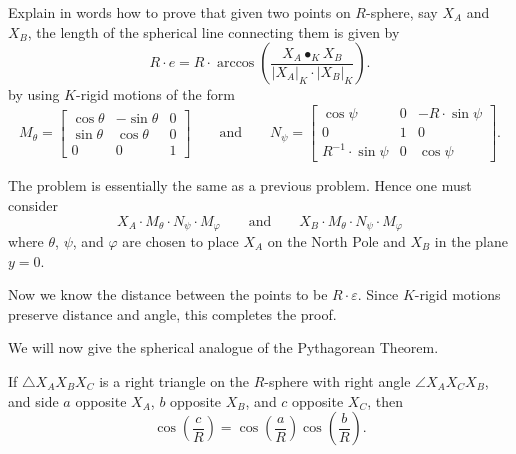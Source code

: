 \documentclass[newpage,hints,handout]{ximera}
\begin{document}
\begin{problem}
  Explain in words how to prove that given two points on $R$-sphere,
  say $X_A$ and $X_B$, the length of the spherical line connecting them
  is given by
  \[
  R\cdot e = R\cdot\arccos\left(\frac{X_A\bullet_K X_B}{|X_A|_K\cdot |X_B|_K}\right).
  \]
  by using $K$-rigid motions of the form
  \[
   M_\theta=
  \begin{bmatrix}
    \cos\theta & -\sin\theta & 0\\
    \sin\theta & \cos\theta & 0\\
    0 & 0 & 1
  \end{bmatrix}
  \qquad\text{and}\qquad
  N_\psi=
  \begin{bmatrix}
    \cos\psi & 0 & -R\cdot\sin\psi\\
    0 & 1 & 0\\
    R^{-1}\cdot\sin\psi & 0 & \cos\psi
  \end{bmatrix}.
  \]
  \begin{freeResponse}
    The problem is essentially the same as a previous problem. Hence one must consider
    \[
    X_A\cdot M_\theta\cdot N_\psi\cdot M_\varphi \qquad\text{and}\qquad
    X_B\cdot M_\theta\cdot N_\psi\cdot M_\varphi
    \]
    where $\theta$, $\psi$, and $\varphi$ are chosen to place $X_A$ on
    the North Pole and $X_B$ in the plane $y=0$.

    Now we know the distance between the points to be $R\cdot
    \varepsilon$. Since $K$-rigid motions preserve distance and angle,
    this completes the proof.
  \end{freeResponse}
\end{problem}


We will now give the spherical analogue of the Pythagorean Theorem.

\begin{theorem}
  If $\triangle X_AX_BX_C$ is a right triangle on the $R$-sphere with right
  angle $\angle X_AX_CX_B$, and side $a$ opposite $X_A$, $b$ opposite $X_B$,
  and $c$ opposite $X_C$, then
  \[
  \cos\left(\frac{c}{R}\right)=\cos\left(\frac{a}{R}\right)\cos\left(\frac{b}{R}\right).
  \]
\end{theorem}
\end{document}
